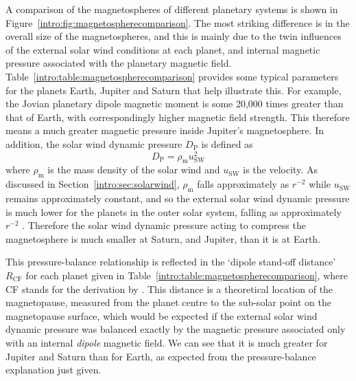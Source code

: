 A comparison of the magnetospheres of different planetary systems is shown in Figure~\ref{intro:fig:magnetospherecomparison}. The most striking difference is in the overall size of the magnetospheres, and this is mainly due to the twin influences of the external solar wind conditions at each planet, and internal magnetic pressure associated with the planetary magnetic field. Table~\ref{intro:table:magnetospherecomparison} provides some typical parameters for the planets Earth, Jupiter and Saturn that help illustrate this. For example, the Jovian planetary dipole magnetic moment is some 20,000 times greater than that of Earth, with correspondingly higher magnetic field strength. This therefore means a much greater magnetic pressure inside Jupiter's magnetosphere. In addition, the solar wind dynamic pressure $D_\mathrm{P}$ is defined as 
\begin{equation}\label{intro:eq:dp}
D_\mathrm{P} = \rho_\mathrm{m}u_\mathrm{SW}^2
\end{equation}
where $\rho_\mathrm{m}$ is the mass density of the solar wind and $u_\mathrm{SW}$ is the velocity. As discussed in Section~\ref{intro:sec:solarwind}, $\rho_\mathrm{m}$ falls approximately as $r^{-2}$ while $u_\mathrm{SW}$ remains approximately constant, and so the external solar wind dynamic pressure is much lower for the planets in the outer solar system, falling as approximately $r^{-2}$ . Therefore the solar wind dynamic pressure acting to compress the magnetosphere is much smaller at Saturn, and Jupiter, than it is at Earth.

This pressure-balance relationship is reflected in the `dipole stand-off distance' $R_\mathrm{CF}$ for each planet given in Table~\ref{intro:table:magnetospherecomparison}, where CF stands for the derivation by \citet{chapman1930}. This distance is a theoretical location of the magnetopause, measured from the planet centre to the sub-solar point on the magnetopause surface, which would be expected if the external solar wind dynamic pressure was balanced exactly by the magnetic pressure associated only with an internal \textit{dipole} magnetic field. We can see that it is much greater for Jupiter and Saturn than for Earth, as expected from the pressure-balance explanation just given.


